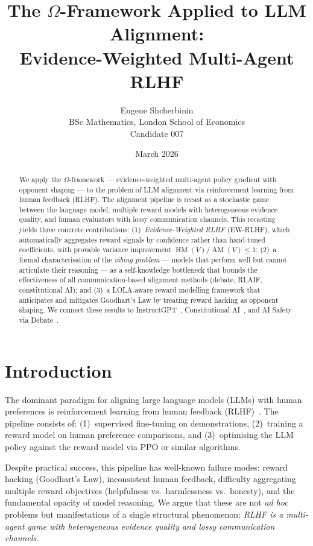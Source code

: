 \documentclass[11pt,a4paper]{article}
\title{The $\Omega$-Framework Applied to LLM Alignment:\\
Evidence-Weighted Multi-Agent RLHF}
\author{Eugene Shcherbinin\\
\small BSc Mathematics, London School of Economics\\
\small Candidate 007}
\date{March 2026}
\DeclareMathOperator{\AM}{AM}
\DeclareMathOperator{\HM}{HM}
\begin{document}
\maketitle

\begin{abstract}
We apply the $\Omega$-framework --- evidence-weighted multi-agent policy gradient with opponent shaping --- to the problem of LLM alignment via reinforcement learning from human feedback (RLHF). The alignment pipeline is recast as a stochastic game between the language model, multiple reward models with heterogeneous evidence quality, and human evaluators with lossy communication channels. This recasting yields three concrete contributions: (1)~\emph{Evidence-Weighted RLHF} (EW-RLHF), which automatically aggregates reward signals by confidence rather than hand-tuned coefficients, with provable variance improvement $\HM(V)/\AM(V) \leq 1$; (2)~a formal characterisation of the \emph{vibing problem} --- models that perform well but cannot articulate their reasoning --- as a self-knowledge bottleneck that bounds the effectiveness of all communication-based alignment methods (debate, RLAIF, constitutional AI); and (3)~a LOLA-aware reward modelling framework that anticipates and mitigates Goodhart's Law by treating reward hacking as opponent shaping. We connect these results to InstructGPT~\cite{ouyang2022}, Constitutional AI~\cite{bai2022}, and AI Safety via Debate~\cite{irving2018}.
\end{abstract}

\tableofcontents

\section{Introduction}
\label{sec:intro}

The dominant paradigm for aligning large language models (LLMs) with human preferences is reinforcement learning from human feedback (RLHF)~\cite{christiano2017, ouyang2022}. The pipeline consists of: (1)~supervised fine-tuning on demonstrations, (2)~training a reward model on human preference comparisons, and (3)~optimising the LLM policy against the reward model via PPO or similar algorithms.

Despite practical success, this pipeline has well-known failure modes: reward hacking (Goodhart's Law), inconsistent human feedback, difficulty aggregating multiple reward objectives (helpfulness vs.\ harmlessness vs.\ honesty), and the fundamental opacity of model reasoning. We argue that these are not \emph{ad hoc} problems but manifestations of a single structural phenomenon: \emph{RLHF is a multi-agent game with heterogeneous evidence quality and lossy communication channels}.
\end{document}
